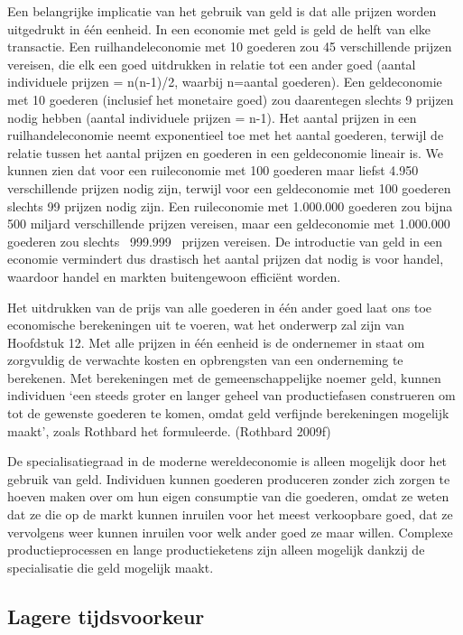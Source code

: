 \documentclass[
  a5paper,
  smalldemyvopaper,11pt,twoside,onecolumn,openright,extrafontsizes,
hidelinks]{memoir}
\begin{document}
Een belangrijke implicatie van het gebruik van geld is dat alle prijzen
worden uitgedrukt in één eenheid. In een economie met geld is geld de
helft van elke transactie. Een ruilhandeleconomie met 10 goederen zou 45
verschillende prijzen vereisen, die elk een goed uitdrukken in relatie
tot een ander goed (aantal individuele prijzen = n(n-1)/2, waarbij
n=aantal goederen). Een geldeconomie met 10 goederen (inclusief het
monetaire goed) zou daarentegen slechts 9 prijzen nodig hebben (aantal
individuele prijzen = n-1). Het aantal prijzen in een ruilhandeleconomie
neemt exponentieel toe met het aantal goederen, terwijl de relatie
tussen het aantal prijzen en goederen in een geldeconomie lineair is. We
kunnen zien dat voor een ruileconomie met 100 goederen maar liefst 4.950
verschillende prijzen nodig zijn, terwijl voor een geldeconomie met 100
goederen slechts 99 prijzen nodig zijn. Een ruileconomie met 1.000.000
goederen zou bijna 500 miljard verschillende prijzen vereisen, maar een
geldeconomie met 1.000.000 goederen zou slechts ~999.999~ prijzen
vereisen. De introductie van geld in een economie vermindert dus
drastisch het aantal prijzen dat nodig is voor handel, waardoor handel
en markten buitengewoon efficiënt worden.

Het uitdrukken van de prijs van alle goederen in één ander goed laat ons
toe economische berekeningen uit te voeren, wat het onderwerp zal zijn
van Hoofdstuk 12. Met alle prijzen in één eenheid is de ondernemer in
staat om zorgvuldig de verwachte kosten en opbrengsten van een
onderneming te berekenen. Met berekeningen met de gemeenschappelijke
noemer geld, kunnen individuen `een steeds groter en langer geheel van
productiefasen construeren om tot de gewenste goederen te komen, omdat
geld verfijnde berekeningen mogelijk maakt', zoals Rothbard het
formuleerde. (Rothbard 2009f)

De specialisatiegraad in de moderne wereldeconomie is alleen mogelijk
door het gebruik van geld. Individuen kunnen goederen produceren zonder
zich zorgen te hoeven maken over om hun eigen consumptie van die
goederen, omdat ze weten dat ze die op de markt kunnen inruilen voor het
meest verkoopbare goed, dat ze vervolgens weer kunnen inruilen voor welk
ander goed ze maar willen. Complexe productieprocessen en lange
productieketens zijn alleen mogelijk dankzij de specialisatie die geld
mogelijk maakt.

\subsection{Lagere tijdsvoorkeur}\label{lagere-tijdsvoorkeur}
\end{document}
